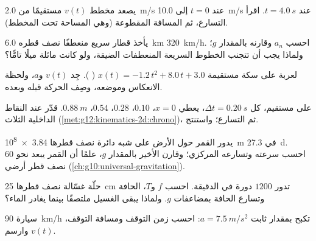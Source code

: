 \begin{exercise}[$\star$]\label{exo:g12:kinematics-2d:5}
يصعد مخطط $v(t)$ مستقيمًا من \qty{2.0}{m/s} عند $t = 0$ إلى
\qty{10.0}{m/s} عند $t = \qty{4.0}{s}$. اقرأ التسارع،
ثم المسافة المقطوعة (وهي المساحة تحت المخطط).
\end{exercise}

\begin{exercise}[$\star\star$]\label{exo:g12:kinematics-2d:6}
يأخذ قطار سريع منعطفًا نصف قطره \qty{6.0}{km} 
\qty{320}{km/h}. احسب $a_n$ وقارنه بالمقدار $g$؛ ولماذا يجب أن
تتجنب الخطوط السريعة المنعطفات الضيقة، ولو كانت مائلة ميلًا تامًّا؟
\end{exercise}

\begin{exercise}[$\star\star$]\label{exo:g12:kinematics-2d:7}
لعربة على سكة مستقيمة $x(t) = -1.2\,t^2 + 8.0\,t + 3.0$
( ). جِد $v(t)$ و$a$، ولحظة الانعكاس وموضعه،
وصِف الحركة قبله وبعده.
\end{exercise}

\begin{exercise}[$\star\star$]\label{exo:g12:kinematics-2d:8}
 على مستقيم، كل $\Delta t = \qty{0.20}{s}$،
يعطي $x = 0$، $0.10$، $0.28$، $0.54$، $\qty{0.88}{m}$. قدّر
 عند النقاط الداخلية الثلاث
(\cref{met:g12:kinematics-2d:chrono})، ثم التسارع؛ واستنتج.
\end{exercise}

\begin{exercise}[$\star\star$]\label{exo:g12:kinematics-2d:9}
يدور القمر حول الأرض على شبه دائرة نصف قطرها \qty{3.84e8}{m}
في \qty{27.3}{d}. احسب سرعته وتسارعه المركزي؛
وقارن الأخير بالمقدار $g$، علمًا أن القمر يبعد نحو $60$ نصف قطر
أرضي (\cref{ch:g10:universal-gravitation}).
\end{exercise}

\begin{exercise}[$\star\star$]\label{exo:g12:kinematics-2d:10}
حلّة غسّالة نصف قطرها \qty{25}{cm} تدور  $1200$
دورة في الدقيقة. احسب $f$ و$T$،  الحافة وتسارع
الحافة بمضاعفات $g$. ولماذا يبقى الغسيل ملتصقًا
بينما يغادر الماء؟
\end{exercise}

\begin{exercise}[$\star\star$]\label{exo:g12:kinematics-2d:11}
سيارة  \qty{90}{km/h} تكبح بمقدار ثابت $a = \qty{7.5}{m/s^2}$:
احسب زمن التوقف ومسافة التوقف، وارسم $v(t)$.
\end{exercise}

